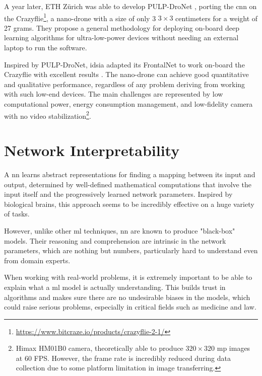 A year later, ETH Zürich was able to develop PULP-DroNet \cite{palossi2019pulpdronetIoTJ}, porting the \gls{cnn} on the Crazyflie\footnote{\url{https://www.bitcraze.io/products/crazyflie-2-1/}}, a nano-drone with a size of only 3 $3 \times 3$ centimeters for a weight of 27 grams. They propose a general methodology for deploying on-board deep learning algorithms for ultra-low-power devices without needing an external laptop to run the software.

\medskip

Inspired by PULP-DroNet, \gls{idsia} adapted its FrontalNet to work on-board the Crazyflie with excellent results \cite{zimmerman2020thesis}. The nano-drone can achieve good quantitative and qualitative performance, regardless of any problem deriving from working with such low-end devices. The main challenges are represented by low computational power, energy consumption management, and low-fidelity camera with no video stabilization\footnote{Himax HM01B0 camera, theoretically able to produce $320 \times 320$ \gls{mp} images at 60 FPS. However, the frame rate is incredibly reduced during data collection due to some platform limitation in image transferring.}.




\section{Network Interpretability}
\label{sec:network-interpretability}


A \gls{nn} learns abstract representations for finding a mapping between its input and output, determined by well-defined mathematical computations that involve the input itself and the progressively learned network parameters. Inspired by biological brains, this approach seems to be incredibly effective on a huge variety of tasks.

\medskip 

However, unlike other \gls{ml} techniques, \gls{nn} are known to produce "black-box" models. Their reasoning and comprehension are intrinsic in the network parameters, which are nothing but numbers, particularly hard to understand even from domain experts. 

When working with real-world problems, it is extremely important to be able to explain what a \gls{ml} model is actually understanding. This builds trust in algorithms and makes sure there are no undesirable biases in the models, which could raise serious problems, especially in critical fields such as medicine and law.

